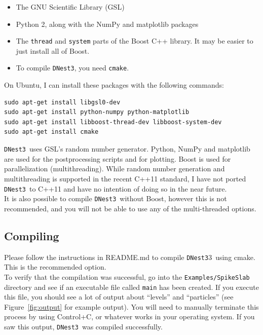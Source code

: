 \documentclass[a4paper, 11pt]{article}
\newcommand{\dnest}{{\tt DNest3}}
\begin{document}
\begin{itemize}
\item The GNU Scientific Library (GSL)
\item Python 2, along with the NumPy and matplotlib packages
\item The {\tt thread} and {\tt system} parts of the Boost C++ library.
It may be easier to just install all of Boost.
\item To compile \dnest, you need {\tt cmake}.\\
\end{itemize}

On Ubuntu, I can install these packages with the following commands:
\begin{verbatim}
sudo apt-get install libgsl0-dev
sudo apt-get install python-numpy python-matplotlib
sudo apt-get install libboost-thread-dev libboost-system-dev
sudo apt-get install cmake
\end{verbatim}

\dnest~uses GSL's random number generator. Python, NumPy and
matplotlib are used for the postprocessing scripts and for
plotting. Boost is used for parallelization (multithreading).
While random number generation and
multithreading is supported
in the recent C++11 standard, I have not ported \dnest~to C++11 and have no
intention of doing so in the near future.\\

It is also possible to compile \dnest~without Boost, however this is not
recommended, and you will not be able to use any of the multi-threaded options.\\

\subsection{Compiling}
Please follow the instructions in README.md to compile \dnest3~using cmake.
This is the recommended option.\\

To
verify that the compilation was successful,
go into the {\tt Examples/SpikeSlab} directory
and see if an executable file called {\tt main} has been created. If you
execute this file, you should see a lot of output about ``levels'' and
``particles'' (see Figure~\ref{fig:output} for example output).
You will need to manually terminate this process by using
Control+C, or whatever works in your operating system. If you saw this output,
\dnest~was compiled successfully.\\
\end{document}
